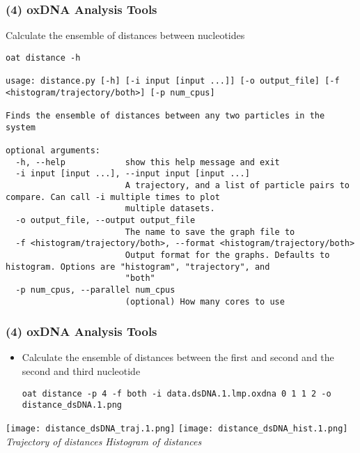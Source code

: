\documentclass[slidestop,compress,9pt]{beamer}
\begin{document}
\begin{frame}[fragile]
\frametitle{(4) oxDNA Analysis Tools}

Calculate the ensemble of distances between nucleotides

\begin{lstlisting} 
oat distance -h

usage: distance.py [-h] [-i input [input ...]] [-o output_file] [-f <histogram/trajectory/both>] [-p num_cpus]

Finds the ensemble of distances between any two particles in the system

optional arguments:
  -h, --help            show this help message and exit
  -i input [input ...], --input input [input ...]
                        A trajectory, and a list of particle pairs to compare. Can call -i multiple times to plot
                        multiple datasets.
  -o output_file, --output output_file
                        The name to save the graph file to
  -f <histogram/trajectory/both>, --format <histogram/trajectory/both>
                        Output format for the graphs. Defaults to histogram. Options are "histogram", "trajectory", and
                        "both"
  -p num_cpus, --parallel num_cpus
                        (optional) How many cores to use
\end{lstlisting}


\end{frame}

\begin{frame}[fragile]
\frametitle{(4) oxDNA Analysis Tools}

\begin{itemize}
\item Calculate the ensemble of distances between the first and second and the second and third nucleotide
\begin{lstlisting}
oat distance -p 4 -f both -i data.dsDNA.1.lmp.oxdna 0 1 1 2 -o distance_dsDNA.1.png
\end{lstlisting}
\end{itemize}

\begin{center}
\texttt{[image: distance\_dsDNA\_traj.1.png]}
\texttt{[image: distance\_dsDNA\_hist.1.png]}\\
\textit{Trajectory of distances}
\hspace*{3cm}
\textit{Histogram of distances}
\end{center}
\end{frame}
\end{document}
